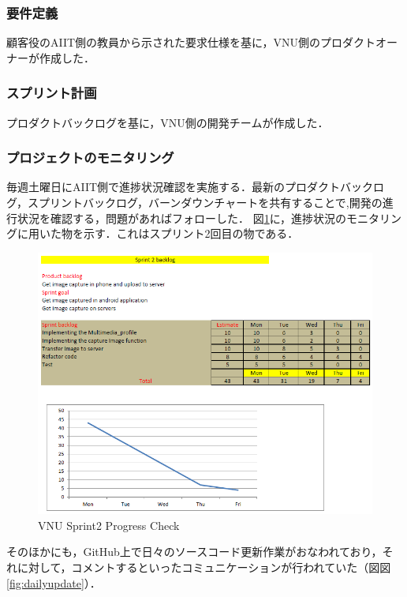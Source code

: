 \documentclass[a4j, 12Q, twocolumn, twoside]{jsarticle}
\begin{document}
\subsubsection{要件定義}
顧客役のAIIT側の教員から示された要求仕様を基に，VNU側のプロダクトオーナーが作成した．

\subsubsection{スプリント計画}
プロダクトバックログを基に，VNU側の開発チームが作成した．
\subsubsection{プロジェクトのモニタリング}


毎週土曜日にAIIT側で進捗状況確認を実施する．最新のプロダクトバックログ，スプリントバックログ，バーンダウンチャートを共有することで,開発の進行状況を確認する，問題があればフォローした．
図\ref{fig:progresscheck}に，進捗状況のモニタリングに用いた物を示す．これはスプリント2回目の物である．

\begin{figure}
  \begin{center}
    \includegraphics[width=\columnwidth]{./figures/Progress.png}
    \caption{VNU Sprint2 Progress Check}
    \label{fig:progresscheck}
  \end{center}
\end{figure}

そのほかにも，GitHub上で日々のソースコード更新作業がおなわれており，それに対して，コメントするといったコミュニケーションが行われていた（図図\ref{fig:dailyupdate}）．
\end{document}
